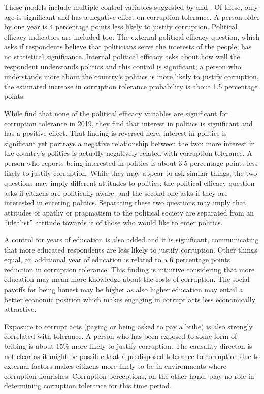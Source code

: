 \documentclass[12pt,a4]{article}\usepackage[]{graphicx}\usepackage[]{xcolor}
\begin{document}
These models include multiple control variables suggested by \textcite{Moscoso.2020} and \textcite{Lupu.2017}. Of these, only age is significant and has a negative effect on corruption tolerance. A person older by one year is 4 percentage points less likely to justify corruption. Political efficacy indicators are included too. The external political efficacy question, which asks if respondents believe that politicians serve the interests of the people, has no statistical significance. Internal political efficacy asks about how well the respondent understands politics and this control is significant; a person who understands more about the country's politics is more likely to justify corruption, the estimated increase in corruption tolerance probability is about 1.5 percentage points.

While \textcite{Moscoso.2020} find that none of the political efficacy variables are significant for corruption tolerance in 2019, they find that interest in politics is significant and has a positive effect. That finding is reversed here: interest in politics is significant yet portrays a negative relationship between the two: more interest in the country's politics is actually negatively related with corruption tolerance. A person who reports being interested in politics is about 3.5 percentage points less likely to justify corruption. While they may appear to ask similar things, the two questions may imply different attitudes to politics: the political efficacy question asks if citizens are politically aware, and the second one asks if they are interested in entering politics. Separating these two questions may imply that attitudes of apathy or pragmatism to the political society are separated from an \enquote{idealist} attitude towards it of those who would like to enter politics.

A control for years of education is also added and it is significant, communicating that more educated respondents are less likely to justify corruption. Other things equal, an additional year of education is related to a 6 percentage points reduction in corruption tolerance. This finding is intuitive considering that more education may mean more knowledge about the costs of corruption. The social payoffs for being honest may be higher as also higher education may entail a better economic position which makes engaging in corrupt acts less economically attractive. 

Exposure to corrupt acts (paying or being asked to pay a bribe) is also strongly correlated with tolerance. A person who has been exposed to some form of bribing is about 15\% more likely to justify corruption. The causality directon is not clear as it might be possible that a predisposed tolerance to corruption due to external factors makes citizens more likely to be in environments where corruption flourishes. Corruption perceptions, on the other hand, play no role in determining corruption tolerance for this time period. 
\end{document}
